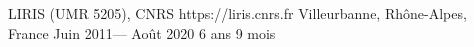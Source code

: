 \jobcompany%
{LIRIS (UMR 5205), CNRS}%
{https://liris.cnrs.fr}%
{Villeurbanne, Rhône-Alpes, France}%
{Juin 2011--- Août 2020}%
{6 ans 9 mois}
{}
